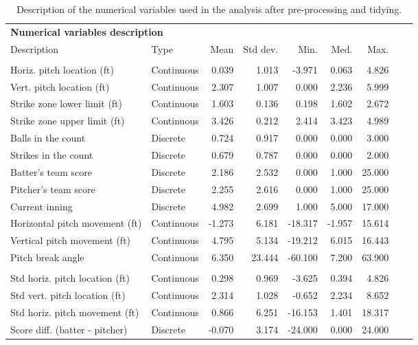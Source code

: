 \begin{table}
\centering\small
\caption{Description of the numerical variables used in the analysis after pre-processing and tidying.}
\label{tab:data.desc.num}
\begin{tabular}{llrrrrrrr}
\toprule
\multicolumn{7}{l}{\textbf{Numerical variables description}}\\\addlinespace

                    Description &        Type &   Mean &  Std dev. &    Min. &   Med. &   Max. \\
\midrule
\addlinespace
\multicolumn{7}{c}{\textbf{Original variables}}\\
\addlinespace

     Horiz. pitch location (ft) &  Continuous &  0.039 &     1.013 &  -3.971 &  0.063 &  4.826 \\
      Vert. pitch location (ft) &  Continuous &  2.307 &     1.007 &   0.000 &  2.236 &  5.999 \\
   Strike zone lower limit (ft) &  Continuous &  1.603 &     0.136 &   0.198 &  1.602 &  2.672 \\
   Strike zone upper limit (ft) &  Continuous &  3.426 &     0.212 &   2.414 &  3.423 &  4.989 \\
             Balls in the count &    Discrete &  0.724 &     0.917 &   0.000 &  0.000 &  3.000 \\
           Strikes in the count &    Discrete &  0.679 &     0.787 &   0.000 &  0.000 &  2.000 \\
            Batter's team score &    Discrete &  2.186 &     2.532 &   0.000 &  1.000 & 25.000 \\
           Pitcher's team score &    Discrete &  2.255 &     2.616 &   0.000 &  1.000 & 25.000 \\
                 Current inning &    Discrete &  4.982 &     2.699 &   1.000 &  5.000 & 17.000 \\
 Horizontal pitch movement (ft) &  Continuous & -1.273 &     6.181 & -18.317 & -1.957 & 15.614 \\
   Vertical pitch movement (ft) &  Continuous &  4.795 &     5.134 & -19.212 &  6.015 & 16.443 \\
              Pitch break angle &  Continuous &  6.350 &    23.444 & -60.100 &  7.200 & 63.900 \\
\addlinespace
\multicolumn{7}{c}{\textbf{Calculated variables}}\\
\addlinespace

 Std horiz. pitch location (ft) &  Continuous &  0.298 &     0.969 &  -3.625 &  0.394 &  4.826 \\
  Std vert. pitch location (ft) &  Continuous &  2.314 &     1.028 &  -0.652 &  2.234 &  8.652 \\
 Std horiz. pitch movement (ft) &  Continuous &  0.866 &     6.251 & -16.153 &  1.401 & 18.317 \\
 Score diff. (batter - pitcher) &    Discrete & -0.070 &     3.174 & -24.000 &  0.000 & 24.000 \\
\bottomrule
\end{tabular}
\end{table}
